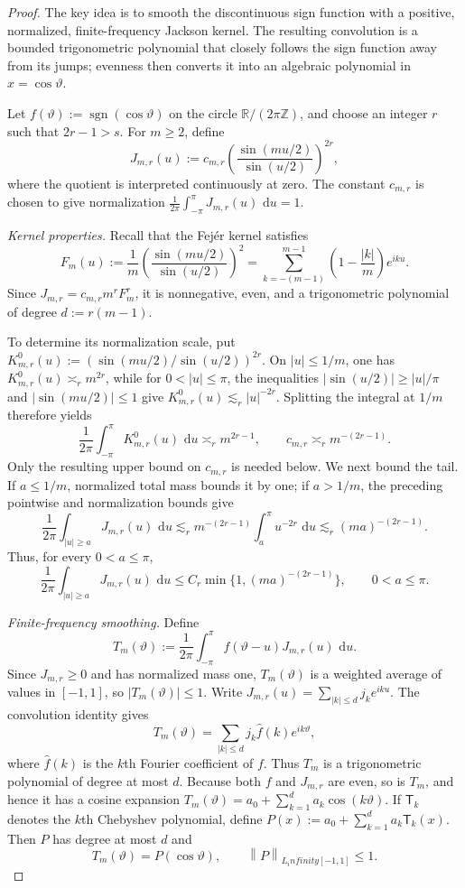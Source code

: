 \documentclass[11pt]{article}
\def\infty{infinity}%
\newcommand{\R}{\mathbb R}
\newcommand{\sgn}{\operatorname{sgn}}
\newcommand{\norm}[1]{\left\lVert#1\right\rVert}
\newcommand{\dd}{\,\mathrm d}
\newcommand\aed[1]{{\color{magenta!60!black} #1}}
\newcommand\eed[1]{{\color{green!45!black} #1}}
\begin{document}
\begin{proof}
\eed{The key idea is to smooth the discontinuous sign function with a positive, normalized, finite-frequency Jackson kernel.  The resulting convolution is a bounded trigonometric polynomial that closely follows the sign function away from its jumps; evenness then converts it into an algebraic polynomial in $x=\cos\vartheta$.

Let $f(\vartheta):=\sgn(\cos\vartheta)$ on the circle $\R/(2\pi\mathbb Z)$, and choose an integer $r$ such that $2r-1>s$.  For $m\ge2$, define
\[
J_{m,r}(u)
:=c_{m,r}
\left(\frac{\sin(mu/2)}{\sin(u/2)}\right)^{2r},
\]
where the quotient is interpreted continuously at zero.  \aed{The constant $c_{m,r}$ is chosen to give normalization $\frac1{2\pi} \int_{-\pi}^{\pi} J_{m,r}(u)\,\dd u=1$.}

\emph{Kernel properties.}
Recall that the Fej\'er kernel satisfies
\[
F_m(u)
:=\frac1m\left(\frac{\sin(mu/2)}{\sin(u/2)}\right)^2
=
\sum_{k=-(m-1)}^{m-1}
\left(1-\frac{|k|}{m}\right)e^{iku}.
\]
Since $J_{m,r}=c_{m,r}m^rF_m^r$, it is nonnegative, even, and a trigonometric polynomial of degree $d:=r(m-1)$.

To determine its normalization scale, put $K_{m,r}^0(u):=(\sin(mu/2)/\sin(u/2))^{2r}$.  On $|u|\le1/m$, one has $K_{m,r}^0(u)\asymp_r m^{2r}$, while for $0<|u|\le\pi$, the inequalities $|\sin(u/2)|\ge|u|/\pi$ and $|\sin(mu/2)|\le1$ give $K_{m,r}^0(u)\lesssim_r|u|^{-2r}$.  Splitting the integral at $1/m$ therefore yields
\[
\frac1{2\pi}\int_{-\pi}^{\pi}K_{m,r}^0(u)\,\dd u
\asymp_r m^{2r-1},
\qquad
c_{m,r}\asymp_r m^{-(2r-1)}.
\]
Only the resulting upper bound on $c_{m,r}$ is needed below.  We next bound the tail.  If $a\le1/m$, normalized total mass bounds it by one; if $a>1/m$, the preceding pointwise and normalization bounds give
\[
\frac1{2\pi}\int_{|u|\ge a}J_{m,r}(u)\,\dd u
\lesssim_r
m^{-(2r-1)}\int_a^\pi u^{-2r}\,\dd u
\lesssim_r
(ma)^{-(2r-1)}.
\]
Thus, for every $0<a\le\pi$,
\begin{equation}
\label{eq:jackson-tail-paper}
\frac1{2\pi}\int_{|u|\ge a}J_{m,r}(u)\,\dd u
\le
C_r\min\{1,(ma)^{-(2r-1)}\},
\qquad 0<a\le\pi.
\end{equation}

\emph{Finite-frequency smoothing.}
Define
\[
T_m(\vartheta)
:=
\frac1{2\pi}\int_{-\pi}^{\pi}
f(\vartheta-u)J_{m,r}(u)\,\dd u.
\]
Since $J_{m,r}\ge0$ and has normalized mass one, $T_m(\vartheta)$ is a weighted average of values in $[-1,1]$, so $|T_m(\vartheta)|\le1$.  Write $J_{m,r}(u)=\sum_{|k|\le d}j_ke^{iku}$.  The convolution identity gives
\[
T_m(\vartheta)
=
\sum_{|k|\le d}j_k\widehat f(k)e^{ik\vartheta},
\]
where $\widehat f(k)$ is the $k$th Fourier coefficient of $f$.  Thus $T_m$ is a trigonometric polynomial of degree at most $d$.  Because both $f$ and $J_{m,r}$ are even, so is $T_m$, and hence it has a cosine expansion $T_m(\vartheta)=a_0+\sum_{k=1}^da_k\cos(k\vartheta)$.  If $\mathsf T_k$ denotes the $k$th Chebyshev polynomial, define $P(x):=a_0+\sum_{k=1}^da_k\mathsf T_k(x)$.  Then $P$ has degree at most $d$ and
\[
T_m(\vartheta)=P(\cos\vartheta),
\qquad
\norm P_{L_\infty[-1,1]}\le1.
\]

}
\end{proof}
\end{document}
